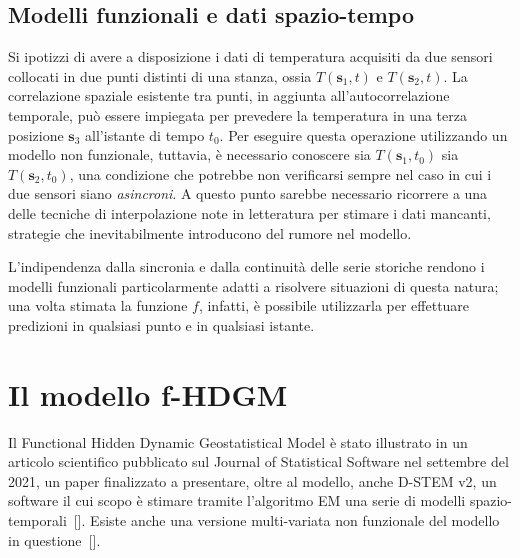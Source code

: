 \subsection[Modelli funzionali e dati spazio-tempo]{Modelli funzionali e dati spazio-tempo}
Si ipotizzi di avere a disposizione i dati di temperatura acquisiti da due sensori collocati in due punti distinti di una stanza, ossia $T(\mathbf{s}_1, t)$ e $T(\mathbf{s}_2, t)$. La correlazione spaziale esistente tra punti, in aggiunta all'autocorrelazione temporale, può essere impiegata per prevedere la temperatura in una terza posizione $\mathbf{s}_3$ all'istante di tempo $t_0$. Per eseguire questa operazione utilizzando un modello non funzionale, tuttavia, è necessario conoscere sia $T(\mathbf{s}_1, t_0)$ sia $T(\mathbf{s}_2, t_0)$, una condizione che potrebbe non verificarsi sempre nel caso in cui i due sensori siano \textit{asincroni}. A questo punto sarebbe necessario ricorrere a una delle tecniche di interpolazione note in letteratura per stimare i dati mancanti, strategie che inevitabilmente introducono del rumore nel modello. \par L'indipendenza dalla sincronia e dalla continuità delle serie storiche rendono i modelli funzionali particolarmente adatti a risolvere situazioni di questa natura; una volta stimata la funzione $f$, infatti, è possibile utilizzarla per effettuare predizioni in qualsiasi punto e in qualsiasi istante.

\section[Il modello f-HDGM]{Il modello f-HDGM}
Il Functional Hidden Dynamic Geostatistical Model è stato illustrato in un articolo scientifico pubblicato sul Journal of Statistical Software nel settembre del \num{2021}, un paper finalizzato a presentare, oltre al modello, anche D-STEM v2, un software il cui scopo è stimare tramite l'algoritmo EM una serie di modelli spazio-temporali~[\cite{paper_f_HDGM}]. Esiste anche una versione multi-variata non funzionale del modello in questione~[\cite{paper_HDGM}].

